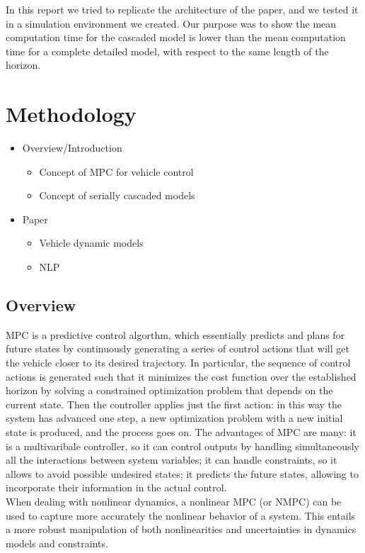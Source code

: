 \documentclass[a4paper, twocolumn, 11pt, twoside]{article}
\begin{document}
In this report we tried to replicate the architecture of the paper, and we tested it in a simulation environment we created.
Our purpose was to show the mean computation time for the cascaded model is lower than the mean computation time for a complete
detailed model, with respect to the same length of the horizon.

\section{Methodology}

\begin{itemize}
    \item Overview/Introduction
    \begin{itemize}
        \item Concept of MPC for vehicle control
        \item Concept of serially cascaded models 
    \end{itemize}

    \item Paper
    \begin{itemize}
        \item Vehicle dynamic models
        \item NLP
    \end{itemize}    
\end{itemize}

\subsection*{Overview}
MPC is a predictive control algorthm, which essentially predicts and plans for future states by continuously generating a series 
of control actions that will get the vehicle closer to its desired trajectory. In particular, the sequence of control actions 
is generated such that it minimizes the cost function over the established horizon by solving a constrained optimization problem
that depends on the current state. Then the controller applies just the first action: in this way the system has advanced one step,
a new optimization problem with a new initial state is produced, and the process goes on.
The advantages of MPC are many: it is a multivaribale controller, so it can control outputs by handling simultaneously all the 
interactions between system variables; it can handle constraints, so it allows to avoid possible undesired states;
it predicts the future states, allowing to incorporate their information in the actual control. \\
When dealing with nonlinear dynamics, a nonlinear MPC (or NMPC) can be used to capture more accurately the nonlinear behavior
of a system. This entails a more robust manipulation of both nonlinearities and uncertainties in dynamics models and constraints.
\end{document}
